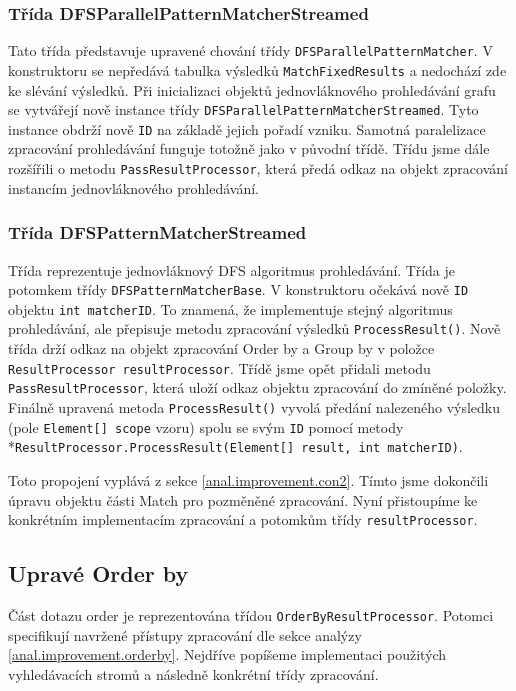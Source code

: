 \subsubsection{Třída DFSParallelPatternMatcherStreamed}

Tato třída představuje upravené chování třídy \texttt{DFSParallelPatternMatcher}.
V konstruktoru se nepředává tabulka výsledků  \texttt{MatchFixedResults} a nedochází zde ke slévání výsledků.
Při inicializaci objektů jednovláknového prohledávání grafu se vytvářejí nově instance třídy \texttt{DFSParallelPatternMatcherStreamed}. 
Tyto instance obdrží nově \texttt{ID} na základě jejich pořadí vzniku.
Samotná paralelizace zpracování prohledávání funguje totožně jako v původní třídě.
Třídu jsme dále rozšířili o metodu \texttt{PassResultProcessor}, která předá odkaz na objekt zpracování instancím jednovláknového prohledávání.

\subsubsection{Třída DFSPatternMatcherStreamed}

Třída reprezentuje jednovláknový DFS algoritmus prohledávání.
Třída je potomkem třídy \texttt{DFSPatternMatcherBase}.
V konstruktoru očekává nově \texttt{ID} objektu \texttt{int matcherID}.
To znamená, že implementuje stejný algoritmus prohledávání, ale přepisuje metodu zpracování výsledků \texttt{ProcessResult()}.
Nově třída drží odkaz na objekt zpracování Order by a Group by v položce \texttt{ResultProcessor resultProcessor}.
Třídě jsme opět přidali metodu \texttt{PassResultProcessor}, která uloží odkaz objektu zpracování do zmíněné položky.
Finálně upravená metoda \texttt{ProcessResult()} vyvolá předání nalezeného výsledku (pole \texttt{Element[] scope} vzoru) spolu se svým \texttt{ID} pomocí metody \\*\texttt{ResultProcessor.ProcessResult(Element[] result, int matcherID)}.

Toto propojení vyplává z sekce \ref{anal.improvement.con2}.
Tímto jsme dokončili úpravu objektu části Match pro pozměněné zpracování.
Nyní přistoupíme ke konkrétním implementacím zpracování a potomkům třídy \texttt{resultProcessor}.

\subsection{Upravé Order by}

Část dotazu order je reprezentována třídou \texttt{OrderByResultProcessor}.
Potomci specifikují navržené přístupy zpracování dle sekce analýzy \ref{anal.improvement.orderby}.
Nejdříve popíšeme implementaci použitých vyhledávacích stromů a následně konkrétní třídy zpracování.

